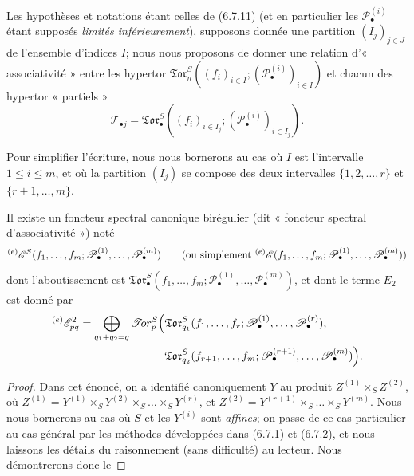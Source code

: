 \begin{env}[6.8.1]
Les hypothèses et notations étant celles de (6.7.11) (et en particulier les
$\mathscr P_\bullet^{(i)}$ étant supposés \emph{limités inférieurement}), supposons
donnée une partition $(I_j)_{j\in J}$ de l'ensemble d'indices $I$; nous nous
proposons de donner une relation d'« associativité » entre les hypertor
$\mathfrak{Tor}_n^S((f_i)_{i\in I};(\mathscr P_\bullet^{(i)})_{i\in I})$ et
chacun des hypertor « partiels »
\[
  \mathscr T_{\bullet j}
  =\mathfrak{Tor}_\bullet^S
  ((f_i)_{i\in I_j};(\mathscr P_\bullet^{(i)})_{i\in I_j}).
\]

Pour simplifier l'écriture, nous nous bornerons au cas où $I$ est
l'intervalle $1\leq i\leq m$, et où la partition $(I_j)$ se compose des deux
intervalles $\{1,2,\ldots,r\}$ et $\{r+1,\ldots,m\}$.
\end{env}

\begin{proposition}[6.8.2]
Il existe un foncteur spectral canonique birégulier \textup{(dit « foncteur spectral
d'associativité »)} noté
\[
  {}^{(e)}\mathscr E^S
  (f_1,\ldots,f_m;
   \mathscr P_\bullet^{(1)},\ldots,\mathscr P_\bullet^{(m)})
  \qquad\textup{(ou simplement ${}^{(e)}\mathscr E(f_1,\ldots,f_m;
\mathscr P_\bullet^{(1)},\ldots,\mathscr P_\bullet^{(m)})$)}
\]
dont
l'aboutissement est
$\mathfrak{Tor}_\bullet^S(f_1,\ldots,f_m;
\mathscr P_\bullet^{(1)},\ldots,\mathscr P_\bullet^{(m)})$, et dont le terme
$E_2$ est donné par
\[
\begin{split}
  {}^{(e)}\mathscr E_{pq}^2
  =\bigoplus_{q_1+q_2=q}
  \mathscr{T}\!or_p^S\Bigl(
  &\mathfrak{Tor}_{q_1}^S
  (f_1,\ldots,f_r;
   \mathscr P_\bullet^{(1)},\ldots,\mathscr P_\bullet^{(r)}),\\
  &\mathfrak{Tor}_{q_2}^S
  (f_{r+1},\ldots,f_m;
   \mathscr P_\bullet^{(r+1)},\ldots,\mathscr P_\bullet^{(m)})
  \Bigr).
\end{split}
\]
\end{proposition}

\begin{proof}
Dans cet énoncé, on a identifié canoniquement $Y$ au produit
$Z^{(1)}\times_S Z^{(2)}$, où
$Z^{(1)}=Y^{(1)}\times_S Y^{(2)}\times_S\ldots\times_S Y^{(r)}$, et
$Z^{(2)}=Y^{(r+1)}\times_S\ldots\times_S Y^{(m)}$. Nous nous bornerons au
cas où $S$ et les $Y^{(i)}$ sont \emph{affines}; on passe de ce cas particulier au
cas général par les méthodes développées dans (6.7.1) et (6.7.2), et nous
laissons les détails du raisonnement (sans difficulté) au lecteur. Nous
démontrerons donc le
\end{proof}

